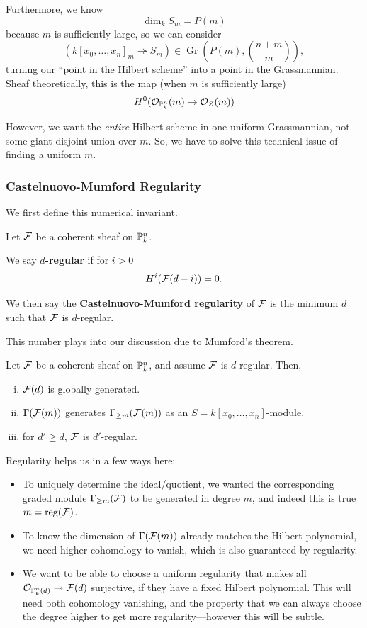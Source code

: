 \documentclass[12pt]{article}
\DeclareMathOperator{\Gr}{Gr}
\begin{document}
Furthermore, we know
\[\dim_k S_m = P(m)\]
because $m$ is sufficiently large, so we can consider
\[(k[x_0,\dots,x_n]_m \twoheadrightarrow S_m) \in \Gr\left(P(m),\binom{n+m}{m}\right),\]
turning our ``point in the Hilbert scheme'' into a point in the Grassmannian. Sheaf theoretically, this is the map (when $m$ is sufficiently large)
\[H^0(\cO_{\P^n_k}(m) \to \cO_Z(m))\]

However, we want the \textit{entire} Hilbert scheme in one uniform Grassmannian, not some giant disjoint union over $m$. So, we have to solve this technical issue of finding a uniform $m$.

\subsubsection{Castelnuovo-Mumford Regularity}

We first define this numerical invariant.

\begin{defn}
    Let $\cF$ be a coherent sheaf on $\P_k^n$.
    
    We say \textbf{$d$-regular} if for $i>0$
    \[H^i(\cF(d-i)) = 0.\]

    We then say the \textbf{Castelnuovo-Mumford regularity} of $\cF$ is the minimum $d$ such that $\cF$ is $d$-regular.
\end{defn}

This number plays into our discussion due to Mumford's theorem.
\begin{thm}
    Let $\cF$ be a coherent sheaf on $\P_k^n$, and assume $\cF$ is $d$-regular. Then,
    \begin{enumerate}[(i)]
        \item $\cF(d)$ is globally generated.
        \item $\Gamma(\cF(m))$ generates $\Gamma_{\geq m}(\cF(m))$ as an $S=k[x_0,\dots,x_n]$-module.
        \item for $d'\geq d$, $\cF$ is $d'$-regular.
    \end{enumerate}
\end{thm}

Regularity helps us in a few ways here:
\begin{itemize}
    \item To uniquely determine the ideal/quotient, we wanted the corresponding graded module $\Gamma_{\geq m}(\cF)$ to be generated in degree $m$, and indeed this is true $m=\reg(\cF)$.
    \item To know the dimension of $\Gamma(\cF(m))$ already matches the Hilbert polynomial, we need higher cohomology to vanish, which is also guaranteed by regularity.
    \item We want to be able to choose a uniform regularity that makes all $\cO_{\P_k^n(d)} \twoheadrightarrow \cF(d)$ surjective, if they have a fixed Hilbert polynomial. This will need both cohomology vanishing, and the property that we can always choose the degree higher to get more regularity---however this will be subtle.
\end{itemize}
\end{document}
